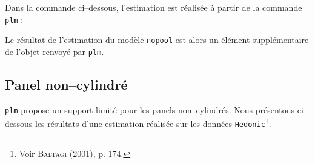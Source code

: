 \documentclass[a4paper]{article}
\begin{document}
Dans la commande ci--dessous, l'estimation est réalisée à partir de la
commande \texttt{plm} :


\begin{Schunk}
\end{Schunk}

Le résultat de l'estimation du modèle \texttt{nopool} est alors un
élément supplémentaire  de l'objet renvoyé par \texttt{plm}.



\subsection{Panel non--cylindré}

\texttt{plm} propose un support limité pour les panels non--cylindrés.
Nous présentons ci--dessous les résultats d'une estimation réalisée
sur les données \texttt{Hedonic}\footnote{Voir \textsc{Baltagi}
  (2001), p. 174.}.
\end{document}
